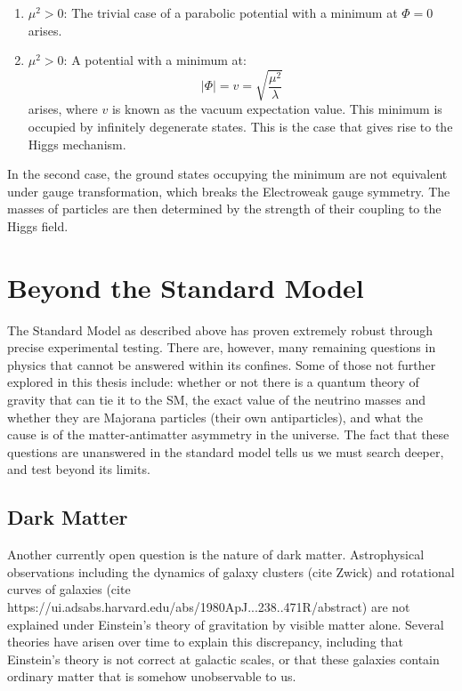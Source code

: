 \begin{enumerate}
    \item ${\mu^2 > 0}$: The trivial case of a parabolic potential with a minimum at $\Phi = 0$ arises.
    \item ${\mu^2 > 0}$: A potential with a minimum at:
     $$|\Phi| = v = \sqrt{\frac{\mu^2}{\lambda}}$$ 
     arises, where $v$ is known as the vacuum expectation value. This minimum is occupied by infinitely degenerate states. This is the case that gives rise to the Higgs mechanism.
\end{enumerate}

In the second case, the ground states occupying the minimum are not equivalent under gauge transformation, which breaks the Electroweak gauge symmetry. The masses of particles are then determined by the strength of their coupling to the Higgs field.

\section{Beyond the Standard Model}
The Standard Model as described above has proven extremely robust through precise experimental testing. There are, however, many remaining questions in physics that cannot be answered within its confines. Some of those not further explored in this thesis include: whether or not there is a quantum theory of gravity that can tie it to the SM, the exact value of the neutrino masses and whether they are Majorana particles (their own antiparticles), and what the cause is of the matter-antimatter asymmetry in the universe. The fact that these questions are unanswered in the standard model tells us we must search deeper, and test beyond its limits.

\subsection{Dark Matter}
Another currently open question is the nature of dark matter. Astrophysical observations including the dynamics of galaxy clusters (cite Zwick) and rotational curves of galaxies (cite https://ui.adsabs.harvard.edu/abs/1980ApJ...238..471R/abstract) are not explained under Einstein's theory of gravitation by visible matter alone. Several theories have arisen over time to explain this discrepancy, including that Einstein's theory is not correct at galactic scales, or that these galaxies contain ordinary matter that is somehow unobservable to us. 

